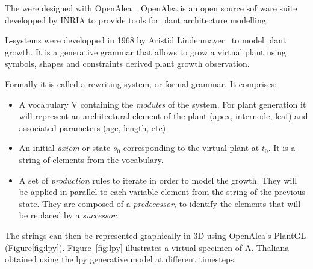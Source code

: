The  were designed with
OpenAlea~\cite{pradal2009plantgl}. OpenAlea is an open source software
suite developped by INRIA to provide tools for plant architecture
modelling. 

 L-systems were developped
in 1968 by Aristid Lindenmayer~\cite{prusinkiewicz2012algorithmic}
to model plant growth.  It is a generative grammar that allows to
grow a virtual plant using symbols, shapes and constraints derived
 plant growth observation.

Formally it is called a rewriting system, or formal grammar. It
comprises:

\begin{itemize}
    \item A vocabulary V containing the \emph{modules} of the
    system. For plant generation it will represent an architectural
    element of the plant (apex, internode, leaf) and associated
    parameters (age, length, etc) \item An initial \emph{axiom}
    or state $s_0$ corresponding to the virtual plant at $t_0$. It
    is a string of elements from the vocabulary.  \item A set
    of \emph{production} rules to iterate in order to model
    the growth. They will be applied in parallel to each variable
    element from the string of the previous state. They are composed
    of a \emph{predecessor}, to identify the elements that will be
    replaced by a \emph{successor}.
\end{itemize}


The strings can then be represented graphically in 3D using OpenAlea's
PlantGL (Figure\ref{fig:lpy}). Figure~\ref{fig:lpy} illustrates a virtual specimen
of A. Thaliana obtained using the lpy generative model at different timesteps.

